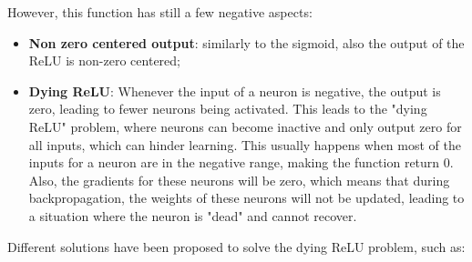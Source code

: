However, this function has still a few negative aspects:
\begin{itemize}
    \item \textbf{Non zero centered output}: similarly to the sigmoid, also the output of the ReLU is non-zero centered;
    \item \textbf{Dying ReLU}: Whenever the input of a neuron is negative, the output is zero, leading to fewer neurons being activated.
    This leads to the "dying ReLU" problem, where neurons can become inactive and only output zero for all inputs, which can hinder learning.
    This usually happens when most of the inputs for a neuron are in the negative range, making the function return 0. Also, the gradients for these neurons will be zero,
    which means that during backpropagation, the weights of these neurons will not be updated, leading to a situation where the neuron is "dead" and cannot recover.
\end{itemize}
Different solutions have been proposed to solve the dying ReLU problem, such as:
